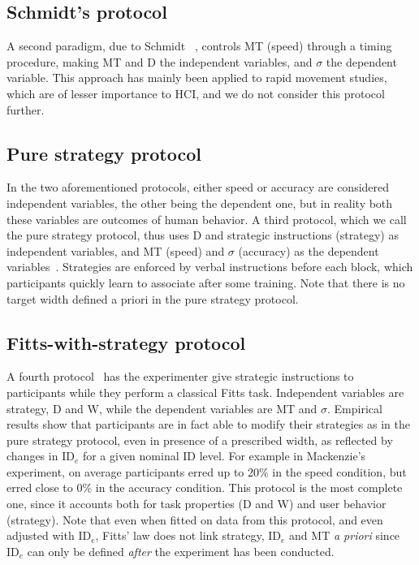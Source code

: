 \documentclass[acmlarge, manuscript,review]{acmart}
\newcommand{\ide}{\ensuremath{{\text{ID}_e}}\xspace}
\begin{document}
\subsection{Schmidt's protocol\label{app:protocols::schmidt_protocol}}
A second paradigm, due to Schmidt \etal~\cite{schmidt1979}, controls MT (speed) through a timing procedure, making MT and D the independent variables, and $\sigma$ the dependent variable. This approach has mainly been applied to rapid movement studies, which are of lesser importance to HCI, and we do not consider this protocol further. %

\subsection{Pure strategy protocol\label{app:protocols::guiard_protocol}}
In the two aforementioned protocols, either speed or accuracy are considered independent variables, the other being the dependent one, but in reality both these variables are outcomes of human behavior.
A third protocol, which we call the pure strategy protocol, thus uses D and strategic instructions (strategy) as independent variables, and MT (speed) and $\sigma$ (accuracy) as the dependent variables~\cite{guiard2011b}. Strategies are enforced by verbal instructions before each block, which participants quickly learn to associate after some training. Note that there is no target width defined a priori in the pure strategy protocol.

\subsection{Fitts-with-strategy protocol\label{app:protocols::full_protocol}}
A fourth protocol~\cite{mackenzie2008, yamanaka2023,batmaz2022} has the experimenter give strategic instructions to participants while they perform a classical Fitts task. Independent variables are strategy, D and W, while the dependent variables are MT and $\sigma$. Empirical results show that participants are in fact able to modify their strategies as in the pure strategy protocol, even in presence of a prescribed width, as reflected \eg by changes in \ide for a given nominal ID level.
For example in Mackenzie's~\cite{mackenzie2008} experiment, on average participants erred up to 20\% in the speed condition, but erred close to 0\% in the accuracy condition. This protocol is the most complete one, since it accounts both for task properties (D and W) and user behavior (strategy).
Note that even when fitted on data from this protocol, and even adjusted with \ide, Fitts' law does not link strategy, \ide and MT \textit{a priori} since \ide can only be defined \textit{after} the experiment has been conducted.
\end{document}
